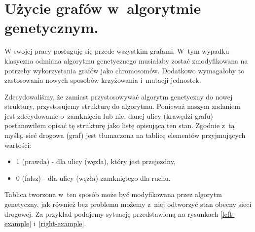 \documentclass[twoside,12pt]{report}
\begin{document}
\section{Użycie grafów w~algorytmie genetycznym.}

W swojej pracy posługuję się przede wszystkim grafami. W~tym wypadku klasyczna odmiana algorytmu genetycznego musiałaby zostać zmodyfikowana na potrzeby wykorzystania grafów jako chromosomów. Dodatkowo wymagałoby to zastosowania nowych sposobów krzyżowania i~mutacji jednostek. 

Zdecydowaliśmy, że zamiast przystosowywać algorytm genetyczny do nowej struktury, przystosujemy strukturę do algorytmu. Ponieważ naszym zadaniem jest zdecydowanie o~zamknięciu lub nie, danej ulicy (krawędzi grafu) postanowiłem opisać tę strukturę jako listę opisującą ten stan. Zgodnie z~tą myślą, sieć drogowa (graf) jest tłumaczona na tablicę elementów przyjmujących wartości:

\begin{itemize}
\item 1 (prawda) - dla ulicy (węzła), który jest przejezdny,
\item 0 (fałsz) - dla ulicy (węzła) zamkniętego dla ruchu.
\end{itemize}

Tablica tworzona w~ten sposób może być modyfikowana przez algorytm genetyczny, jak również bez problemu możemy z~niej odtworzyć stan obecny sieci drogowej. Za przykład podajemy sytuację przedstawioną na rysunkach \ref{left-example} i~\ref{right-example}.
\end{document}
